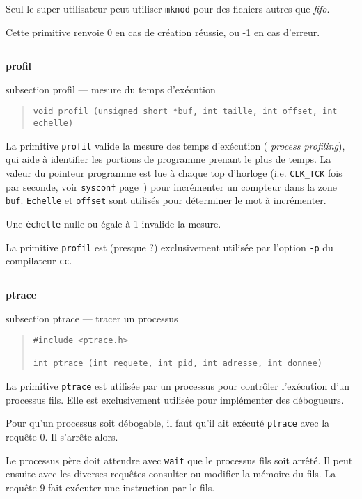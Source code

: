 \documentclass [twoside] {report}
\newcommand {\primitive} [1]
    {
	\phantomsection
	{\large \textbf {#1}}
	\addcontentsline {toc} {subsection} {#1}
    }
\newcommand {\separation}
    {
	\vspace {5mm}
	\nopagebreak
	\hrule
    }
\begin{document}
Seul le super utilisateur peut utiliser \texttt {mknod}
pour des fichiers autres que \textit {fifo}.

Cette primitive renvoie 0 en cas de création
réussie, ou -1 en cas d'erreur.




\separation
\primitive {profil} --- mesure du temps d'exécution

\begin {quote}
\begin {verbatim}
void profil (unsigned short *buf, int taille, int offset, int echelle)
\end{verbatim}
\end {quote}

La primitive \texttt {profil} valide la mesure des temps d'exécution ({\it
process profiling}), qui aide à identifier les portions de programme
prenant le plus de temps. La valeur du pointeur programme est lue à
chaque top d'horloge (i.e. \texttt {CLK\_TCK} fois par seconde, voir
\texttt {sysconf} page~\pageref {sysconf}) pour incrémenter un compteur dans
la zone \texttt {buf}. \texttt {Echelle} et \texttt {offset} sont utilisés pour
déterminer le mot à incrémenter.

Une \texttt {échelle} nulle ou égale à 1 invalide la
mesure.

La primitive \texttt {profil} est (presque ?) exclusivement
utilisée par l'option \texttt {-p} du compilateur \texttt {cc}.




\separation
\primitive {ptrace} --- tracer un processus

\begin {quote}
\begin {verbatim}
#include <ptrace.h>

int ptrace (int requete, int pid, int adresse, int donnee)
\end{verbatim}
\end {quote}

La primitive \texttt {ptrace} est utilisée par un
processus pour contrôler l'exécution d'un
processus fils. Elle est exclusivement utilisée
pour implémenter des débogueurs.

Pour qu'un processus soit débogable, il faut
qu'il ait exécuté \texttt {ptrace} avec la requête 0. Il
s'arrête alors.

Le processus père doit attendre avec \texttt {wait} que
le processus fils soit arrêté. Il peut ensuite
avec les diverses requêtes consulter ou modifier
la mémoire du fils. La requête 9 fait exécuter une
instruction par le fils.
\end{document}

